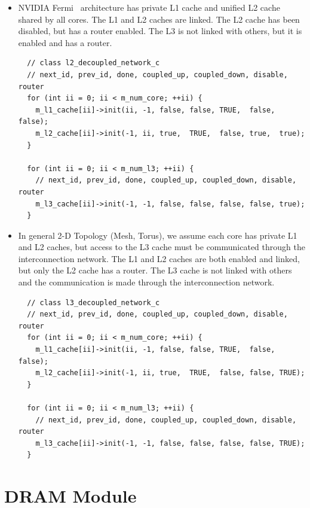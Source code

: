 \begin{itemize}
\begin{lstlisting}
  \end{lstlisting}
  \smallskip

  \item NVIDIA Fermi~\cite{fermi} architecture has private L1 cache
  and unified L2 cache shared by all cores. The L1 and L2 caches are
  linked. The L2 cache has been disabled, but has a router
  enabled. The L3 is not linked with others, but it is enabled and has
  a router.

  \smallskip
  \begin{lstlisting}
  // class l2_decoupled_network_c
  // next_id, prev_id, done, coupled_up, coupled_down, disable, router
  for (int ii = 0; ii < m_num_core; ++ii) {
    m_l1_cache[ii]->init(ii, -1, false, false, TRUE,  false, false);
    m_l2_cache[ii]->init(-1, ii, true,  TRUE,  false, true,  true);
  }

  for (int ii = 0; ii < m_num_l3; ++ii) {
    // next_id, prev_id, done, coupled_up, coupled_down, disable, router
    m_l3_cache[ii]->init(-1, -1, false, false, false, false, true);
  }

  \end{lstlisting}
  \smallskip
  
  \item In general 2-D Topology (Mesh, Torus), we assume each core has
  private L1 and L2 caches, but access to the L3 cache must be
  communicated through the interconnection network. The L1 and L2
  caches are both enabled and linked, but only the L2 cache has a
  router. The L3 cache is not linked with others and the communication
  is made through the interconnection network.

  \smallskip
  \begin{lstlisting}
  // class l3_decoupled_network_c
  // next_id, prev_id, done, coupled_up, coupled_down, disable, router
  for (int ii = 0; ii < m_num_core; ++ii) {
    m_l1_cache[ii]->init(ii, -1, false, false, TRUE,  false, false);
    m_l2_cache[ii]->init(-1, ii, true,  TRUE,  false, false, TRUE);
  }

  for (int ii = 0; ii < m_num_l3; ++ii) {
    // next_id, prev_id, done, coupled_up, coupled_down, disable, router
    m_l3_cache[ii]->init(-1, -1, false, false, false, false, TRUE);
  }

  \end{lstlisting}
  \smallskip

\end{itemize}

\section{DRAM Module} 

